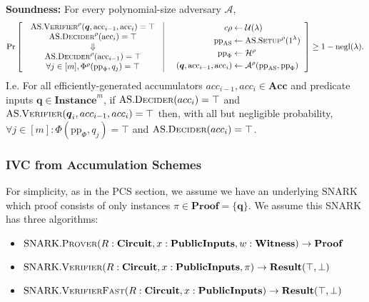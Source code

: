\documentclass[
]{article}
\providecommand{\tightlist}{%
  \setlength{\itemsep}{0pt}\setlength{\parskip}{0pt}}
\newcommand*\Ac{\mathcal{A}}
\renewcommand*\l{\lambda}
\renewcommand{\vec}[1]{ \boldsymbol{#1} }
\newcommand*{\pp}{\mathrm{pp}}
\newcommand*{\acc}{\mathrm{acc}}
\newcommand*{\Prover}{\mathrm{\text{P\scriptsize ROVER}}}
\newcommand*{\Verifier}{\mathrm{\text{V\scriptsize ERIFIER}}}
\newcommand*{\Setup}{\mathrm{\text{S{\scriptsize ETUP}}}}
\newcommand*{\Decider}{\mathrm{\text{D{\scriptsize ECIDER}}}}
\newcommand*{\SNARKProver}{\mathrm{\text{SNARK}}.\Prover}
\newcommand*{\SNARKVerifier}{\mathrm{\text{SNARK}}.\Verifier}
\newcommand*{\SNARKVerifierFast}{\mathrm{\text{SNARK}}.\mathrm{\text{V\scriptsize ERIFIER}\text{F\scriptsize AST}}}
\newcommand*{\AS}{\text{AS}}
\newcommand*{\ASSetup}{\AS.\Setup}
\newcommand*{\ASVerifier}{\AS.\Verifier}
\newcommand*{\ASDecider}{\AS.\Decider}
\newcommand*\Result{\mathbf{Result}}
\newcommand*\Acc{\mathbf{Acc}}
\newcommand*\Instance{\mathbf{Instance}}
\newcommand*\Proof{\mathbf{Proof}}
\newcommand*\Witness{\mathbf{Witness}}
\newcommand*\PublicInfo{\mathbf{PublicInputs}}
\newcommand*\Circuit{\mathbf{Circuit}}
\begin{document}
\textbf{Soundness:} For every polynomial-size adversary \(\Ac\), \[
\Pr \left[
  \begin{array}{c|c}
    \begin{array}{c}
      \ASVerifier^\rho(\vec{q}, \acc_{i-1}, \acc_i) = \top \\
      \ASDecider^\rho(\acc_i) = \top \\
      \Downarrow \\
      \ASDecider^\rho(\acc_{i-1}) = \top \\
      \forall j \in [m], \Phi^{\rho}(\pp_{\Phi}, q_j) = \top
    \end{array}
    &\quad
    \begin{aligned}{c}
      \rho                          &\leftarrow \mathcal{U}(\l) \\
      \pp_\AS                       &\leftarrow \ASSetup^\rho(1^{\l}) \\
      \pp_{\Phi}                    &\leftarrow \mathcal{H}^{\rho} \\
      (\vec{q}, \acc_{i-1}, \acc_i) &\leftarrow \Ac^\rho(\pp_\AS, \pp_\Phi)
    \end{aligned}
  \end{array}
\right] \geq 1 - \text{negl}(\lambda).
\] I.e. For all efficiently-generated accumulators
\(acc_{i-1}, acc_i \in \Acc\) and predicate inputs
\(\vec{q} \in \Instance^m\), if \(\ASDecider(acc_i)
= \top\) and \(\ASVerifier(\vec{q}_i, acc_{i-1}, acc_i) = \top\) then,
with all but negligible probability,
\(\forall j \in [m] : \Phi(\pp_\Phi, q_j) = \top\) and
\(\ASDecider(acc_i) = \top\).

\subsubsection{IVC from Accumulation
Schemes}\label{ivc-from-accumulation-schemes}

For simplicity, as in the PCS section, we assume we have an underlying
SNARK which proof consists of only instances
\(\pi \in \Proof = \{ \vec{q} \}\). We assume this SNARK has three
algorithms:

\begin{itemize}
\tightlist
\item
  \(\SNARKProver(R: \Circuit, x: \PublicInfo, w: \Witness) \to \Proof\)
\item
  \(\SNARKVerifier(R: \Circuit, x: \PublicInfo, \pi) \to \Result(\top, \bot)\)
\item
  \(\SNARKVerifierFast(R: \Circuit, x: \PublicInfo) \to \Result(\top, \bot)\)
\end{itemize}
\end{document}
